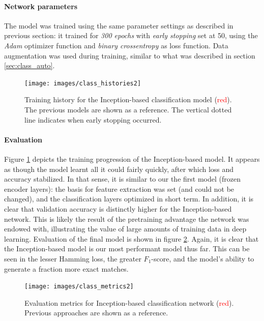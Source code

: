\paragraph{Network parameters} The model was trained using the same parameter settings as described in previous section: it trained for \textit{300 epochs} with \textit{early stopping} set at 50, using the \textit{Adam} optimizer function and \textit{binary crossentropy} as loss function. Data augmentation was used during training, similar to what was described in section \textcolor{blue}{\ref{sec:class_auto}}.

\begin{figure}[!htbp]
	\begin{center}
		\texttt{[image: images/class\_histories2]}
		\caption{Training history for the Inception-based classification model (\textcolor{red}{red}). The previous models are shown as a reference. The vertical dotted line indicates when early stopping occurred.}
		\label{fig:class_histories2}
	\end{center}
\end{figure}

\paragraph{Evaluation}
Figure \ref{fig:class_histories2} depicts the training progression of the Inception-based model. It appears as though the model learnt all it could fairly quickly, after which loss and accuracy stabilized. In that sense, it is similar to our the first model (frozen encoder layers): the basis for feature extraction was set (and could not be changed), and the classification layers optimized in short term. In addition, it is clear that validation accuracy is distinctly higher for the Inception-based network. This is likely the result of the pretraining advantage the network was endowed with, illustrating the value of large amounts of training data in deep learning. Evaluation of the final model is shown in figure \ref{fig:class_metrics2}. Again, it is clear that the Inception-based model is our most performant model thus far. This can be seen in the lesser Hamming loss, the greater $F_1$-score, and the model's ability to generate a fraction more exact matches.

\begin{figure}[!htbp]
	\begin{center}
		\texttt{[image: images/class\_metrics2]}
		\caption{Evaluation metrics for Inception-based classification network (\textcolor{red}{red}). Previous approaches are shown as a reference.}
		\label{fig:class_metrics2}
	\end{center}
\end{figure}




